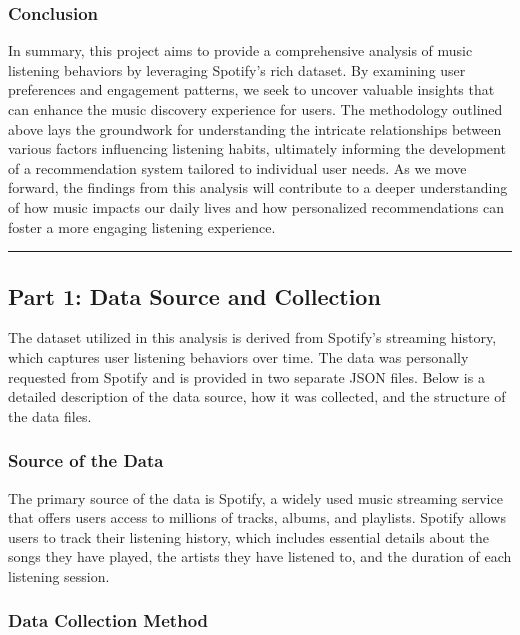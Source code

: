 \documentclass[
]{article}
\begin{document}
\subsubsection{Conclusion}\label{conclusion}

In summary, this project aims to provide a comprehensive analysis of
music listening behaviors by leveraging Spotify's rich dataset. By
examining user preferences and engagement patterns, we seek to uncover
valuable insights that can enhance the music discovery experience for
users. The methodology outlined above lays the groundwork for
understanding the intricate relationships between various factors
influencing listening habits, ultimately informing the development of a
recommendation system tailored to individual user needs. As we move
forward, the findings from this analysis will contribute to a deeper
understanding of how music impacts our daily lives and how personalized
recommendations can foster a more engaging listening experience.

\begin{center}\rule{0.5\linewidth}{0.5pt}\end{center}

\subsection{Part 1: Data Source and
Collection}\label{part-1-data-source-and-collection}

The dataset utilized in this analysis is derived from Spotify's
streaming history, which captures user listening behaviors over time.
The data was personally requested from Spotify and is provided in two
separate JSON files. Below is a detailed description of the data source,
how it was collected, and the structure of the data files.

\subsubsection{Source of the Data}\label{source-of-the-data}

The primary source of the data is Spotify, a widely used music streaming
service that offers users access to millions of tracks, albums, and
playlists. Spotify allows users to track their listening history, which
includes essential details about the songs they have played, the artists
they have listened to, and the duration of each listening session.

\subsubsection{Data Collection Method}\label{data-collection-method}
\end{document}
